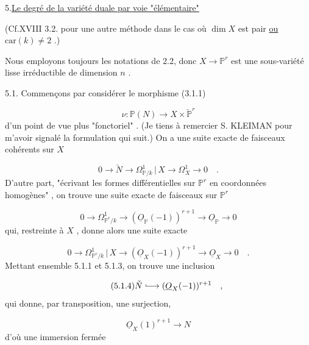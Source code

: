 5.\quad \underline{Le degré de la variété duale par voie "élémentaire"}

(Cf.XVIII 3.2. pour une autre méthode dans le cas où $\dim X$ est pair \underline{ou} $\mathrm{car}(k) \neq 2$ .)

Nous employons toujours les notations de 2.2, donc $X \longrightarrow \mathbb{P}^r$ est une sous-variété lisse irréductible de dimension $n$ .

5.1. Commençons par considérer le morphisme (3.1.1)

\begin{equation}\tag{5.1.0}
\nu : \mathbb{P}(N) \longrightarrow X \times \check{\mathbb{P}}^r
\end{equation}
d'un point de vue plus "fonctoriel" . (Je tiens à remercier S. KLEIMAN pour m'avoir signalé la formulation qui suit.) On a une suite exacte
de faisceaux cohérents sur $X$

\begin{equation}\tag{5.1.1}
0 \longrightarrow \check{N} \longrightarrow \Omega^1_{\mathbb{P}/k} \,|\, X \longrightarrow \Omega^1_X \longrightarrow 0 \quad .
\end{equation}
D'autre part, "écrivant les formes différentielles sur $\mathbb{P}^r$ en coordonnées homogènes" , on trouve une suite exacte de faisceaux sur $\mathbb{P}^r$

\begin{equation}\tag{5.1.2}
0 \longrightarrow \Omega^1_{\mathbb{P}^r/k} \longrightarrow (\underline{O}_{\mathbb{P}}(-1))^{r+1} \longrightarrow \underline{O}_{\mathbb{P}} \longrightarrow 0
\end{equation}
qui, restreinte à $X$ , donne alors une suite exacte

\begin{equation}\tag{5.1.3}
0 \longrightarrow \Omega^1_{\mathbb{P}^r/k} \,|\, X \longrightarrow (\underline{O}_X(-1))^{r+1} \longrightarrow \underline{O}_X \longrightarrow 0 \quad .
\end{equation}
Mettant ensemble 5.1.1 et 5.1.3, on trouve une inclusion

\begin{equation}\tag{5.1.4}
\check{N} \lhook\joinrel\longrightarrow (\underline{O}_X(-1))^{r+1} \quad ,
\end{equation}
qui donne, par transposition, une surjection,

\begin{equation}\tag{5.1.5}
\underline{O}_X(1)^{r+1} \longrightarrow N
\end{equation}
d'où une immersion fermée


